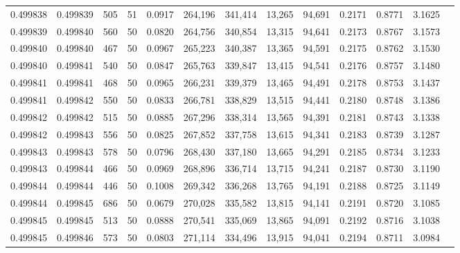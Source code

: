 \begin{tabular}{rrrrrrrrrrrrr}
0.499838 & 0.499839 &   505 &  51 &                                     0.0917 & 264,196 & 341,414 &  13,265 &  94,691 & 0.2171 & 0.8771 & 3.1625 \\
0.499839 & 0.499840 &   560 &  50 &                                     0.0820 & 264,756 & 340,854 &  13,315 &  94,641 & 0.2173 & 0.8767 & 3.1573 \\
0.499840 & 0.499840 &   467 &  50 &                                     0.0967 & 265,223 & 340,387 &  13,365 &  94,591 & 0.2175 & 0.8762 & 3.1530 \\
0.499840 & 0.499841 &   540 &  50 &                                     0.0847 & 265,763 & 339,847 &  13,415 &  94,541 & 0.2176 & 0.8757 & 3.1480 \\
0.499841 & 0.499841 &   468 &  50 &                                     0.0965 & 266,231 & 339,379 &  13,465 &  94,491 & 0.2178 & 0.8753 & 3.1437 \\
0.499841 & 0.499842 &   550 &  50 &                                     0.0833 & 266,781 & 338,829 &  13,515 &  94,441 & 0.2180 & 0.8748 & 3.1386 \\
0.499842 & 0.499842 &   515 &  50 &                                     0.0885 & 267,296 & 338,314 &  13,565 &  94,391 & 0.2181 & 0.8743 & 3.1338 \\
0.499842 & 0.499843 &   556 &  50 &                                     0.0825 & 267,852 & 337,758 &  13,615 &  94,341 & 0.2183 & 0.8739 & 3.1287 \\
0.499843 & 0.499843 &   578 &  50 &                                     0.0796 & 268,430 & 337,180 &  13,665 &  94,291 & 0.2185 & 0.8734 & 3.1233 \\
0.499843 & 0.499844 &   466 &  50 &                                     0.0969 & 268,896 & 336,714 &  13,715 &  94,241 & 0.2187 & 0.8730 & 3.1190 \\
0.499844 & 0.499844 &   446 &  50 &                                     0.1008 & 269,342 & 336,268 &  13,765 &  94,191 & 0.2188 & 0.8725 & 3.1149 \\
0.499844 & 0.499845 &   686 &  50 &                                     0.0679 & 270,028 & 335,582 &  13,815 &  94,141 & 0.2191 & 0.8720 & 3.1085 \\
0.499845 & 0.499845 &   513 &  50 &                                     0.0888 & 270,541 & 335,069 &  13,865 &  94,091 & 0.2192 & 0.8716 & 3.1038 \\
0.499845 & 0.499846 &   573 &  50 &                                     0.0803 & 271,114 & 334,496 &  13,915 &  94,041 & 0.2194 & 0.8711 & 3.0984 \\

\end{tabular}
